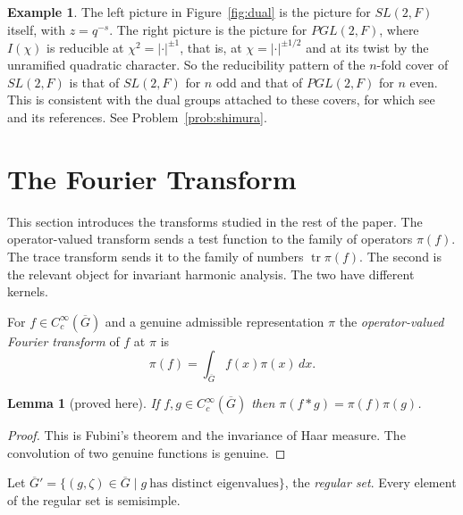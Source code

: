 \documentclass[12pt,letterpaper]{article}
\numberwithin{equation}{section}
\newtheorem{lemma}[theorem]{Lemma}
\theoremstyle{definition}
\newtheorem{xexample}[theorem]{Example}
\newcommand{\proved}{proved here}
\newcommand{\bG}{\overline{G}}
\DeclareMathOperator{\tr}{tr}
\begin{document}
\begin{xexample}\label{ex:two-pictures}
The left picture in Figure~\ref{fig:dual} is the picture for $SL(2,F)$ itself, with
$z=q^{-s}$.  The right picture is the picture for $PGL(2,F)$, where $I(\chi)$ is reducible
at $\chi^2=|\cdot|^{\pm1}$, that is, at $\chi=|\cdot|^{\pm1/2}$ and at its twist by the
unramified quadratic character.  So the reducibility pattern of the $n$-fold cover of
$SL(2,F)$ is that of $SL(2,F)$ for $n$ odd and that of $PGL(2,F)$ for $n$ even.  This is
consistent with the dual groups attached to these covers, for which see \cite{GSS23} and
its references.  See Problem~\ref{prob:shimura}.
\end{xexample}
\section{The Fourier Transform}\label{sec:fourier}

This section introduces the transforms studied in the rest of the paper.  The
operator-valued transform sends a test function to the family of operators $\pi(f)$.  The
trace transform sends it to the family of numbers $\tr\pi(f)$.  The second is the relevant
object for invariant harmonic analysis.  The two have different kernels.

For $f\in C_c^\infty(\bG)$ and a genuine admissible representation $\pi$ the
\emph{operator-valued Fourier transform} of $f$ at $\pi$ is
\[
\pi(f)=\int_{\bG}f(x)\pi(x)\,dx .
\]

\begin{lemma}[\proved]\label{lem:conv}
If $f,g\in C_c^\infty(\bG)$ then $\pi(f*g)=\pi(f)\pi(g)$.
\end{lemma}
\begin{proof}
This is Fubini's theorem and the invariance of Haar measure.  The convolution of two
genuine functions is genuine.
\end{proof}

Let $\bG'=\{(g,\zeta)\in\bG\mid g\ \text{has distinct eigenvalues}\}$, the \emph{regular
set}.  Every element of the regular set is semisimple.
\end{document}
